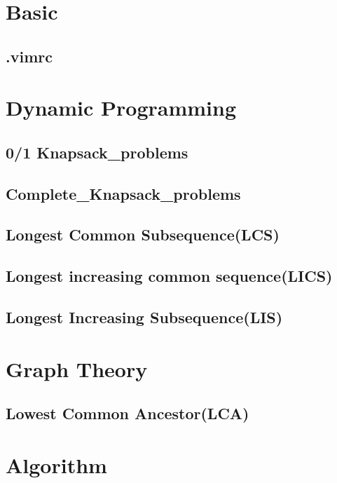 \section{Basic}
    \subsection{.vimrc}
        

\section{Dynamic Programming}
    \subsection{0/1 Knapsack\_problems}
        
    \subsection{Complete\_Knapsack\_problems}
        
    \subsection{Longest Common Subsequence(LCS)}
        
    \subsection{Longest increasing common sequence(LICS)}
        
    \subsection{Longest Increasing Subsequence(LIS)}
        
\section{Graph Theory}
    \subsection{Lowest Common Ancestor(LCA)}
        
\section{Algorithm}
